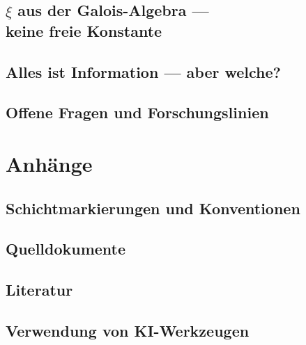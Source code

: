 \documentclass[11pt,oneside]{book}
\theoremstyle{plain}
\begin{document}
\chapter[\texorpdfstring{$\xi$}{xi} aus der Galois-Algebra]{$\xi$ aus der Galois-Algebra ---\\ keine freie Konstante}

\chapter[Alles ist Information]{Alles ist Information --- aber welche?}

\chapter{Offene Fragen und Forschungslinien}
\label{ch:offene_fragen}


\backmatter
\appendix
\part*{Anhänge}
\chapter{Schichtmarkierungen und Konventionen}

\chapter{Quelldokumente}

\chapter{Literatur}

\chapter{Verwendung von KI-Werkzeugen}

\end{document}
